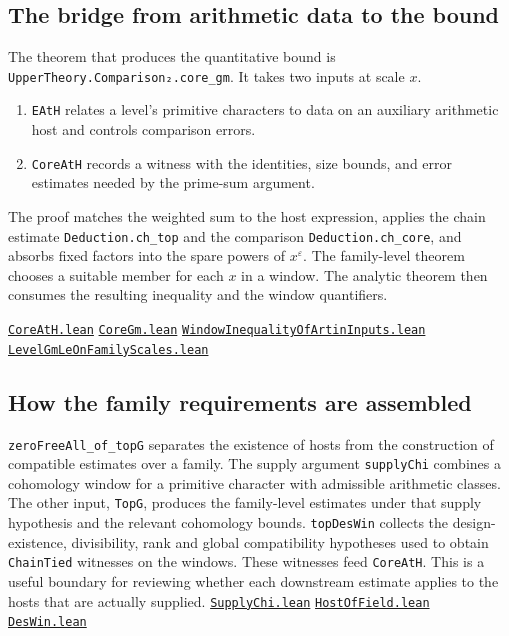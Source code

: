 \documentclass[11pt,a4paper]{article}
\newcommand{\repo}{https://github.com/LiRunGuo/riemann-lean-verification}
\newcommand{\code}[1]{\texttt{#1}}
\newcommand{\src}[2]{\href{\repo/blob/main/lean/src/#1}{\mbox{\nolinkurl{#2}}}}
\newcommand{\cb}{Development/AutomorphicArithmetic/CharacterBoxes}
\newcommand{\pc}{Development/AutomorphicArithmetic/PrimitiveCosets}
\begin{document}
\subsection*{The bridge from arithmetic data to the bound}

The theorem that produces the quantitative bound is \code{UpperTheory.Comparison₂.core\_gm}.
It takes two inputs at scale $x$.

\begin{enumerate}
\item \code{EAtH} relates a level's primitive characters to data on an
auxiliary arithmetic host and controls comparison errors.
\item \code{CoreAtH} records a witness with the identities, size bounds,
and error estimates needed by the prime-sum argument.
\end{enumerate}

The proof matches the weighted sum to the host expression, applies the
chain estimate \code{Deduction.ch\_top} and the comparison
\code{Deduction.ch\_core}, and absorbs fixed factors into the spare powers
of $x^\varepsilon$. The family-level theorem chooses a suitable member
for each $x$ in a window. The analytic theorem then consumes the resulting
inequality and the window quantifiers.
\par{\small\raggedright \src{\pc/CoreAtH.lean}{CoreAtH.lean}
\src{\pc/CoreGm.lean}{CoreGm.lean}
\src{\pc/WindowInequalityOfArtinInputs.lean}{WindowInequalityOfArtinInputs.lean}
\src{\pc/LevelGmLeOnFamilyScales.lean}{LevelGmLeOnFamilyScales.lean}\par}

\subsection*{How the family requirements are assembled}

\code{zeroFreeAll\_of\_topG} separates the existence of hosts from the
construction of compatible estimates over a family. The supply argument
\code{supplyChi} combines a cohomology window for a primitive character
with admissible arithmetic classes. The other input, \code{TopG}, produces
the family-level estimates under that supply hypothesis and the relevant
cohomology bounds. \code{topDesWin} collects the design-existence,
divisibility, rank and global compatibility hypotheses used to obtain
\code{ChainTied} witnesses on the windows. These witnesses feed
\code{CoreAtH}. This is a useful boundary for reviewing whether each
downstream estimate applies to the hosts that are actually supplied.
\src{\cb/SupplyChi.lean}{SupplyChi.lean}
\src{\cb/HostOfField.lean}{HostOfField.lean}
\src{\cb/DesWin.lean}{DesWin.lean}
\end{document}
